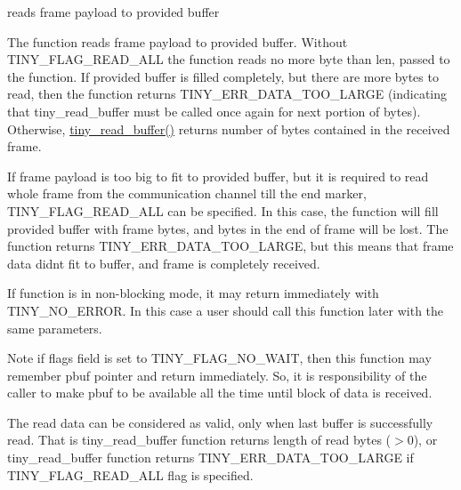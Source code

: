 reads frame payload to provided buffer 

The function reads frame payload to provided buffer. Without T\+I\+N\+Y\+\_\+\+F\+L\+A\+G\+\_\+\+R\+E\+A\+D\+\_\+\+A\+LL the function reads no more byte than len, passed to the function. If provided buffer is filled completely, but there are more bytes to read, then the function returns T\+I\+N\+Y\+\_\+\+E\+R\+R\+\_\+\+D\+A\+T\+A\+\_\+\+T\+O\+O\+\_\+\+L\+A\+R\+GE (indicating that tiny\+\_\+read\+\_\+buffer must be called once again for next portion of bytes). Otherwise, \hyperlink{group__ADVANCED__API_gade4e07eb12b8e32e6dd0c7b9757e8f39}{tiny\+\_\+read\+\_\+buffer()} returns number of bytes contained in the received frame.

If frame payload is too big to fit to provided buffer, but it is required to read whole frame from the communication channel till the end marker, T\+I\+N\+Y\+\_\+\+F\+L\+A\+G\+\_\+\+R\+E\+A\+D\+\_\+\+A\+LL can be specified. In this case, the function will fill provided buffer with frame bytes, and bytes in the end of frame will be lost. The function returns T\+I\+N\+Y\+\_\+\+E\+R\+R\+\_\+\+D\+A\+T\+A\+\_\+\+T\+O\+O\+\_\+\+L\+A\+R\+GE, but this means that frame data didn\textquotesingle{}t fit to buffer, and frame is completely received.

If function is in non-\/blocking mode, it may return immediately with T\+I\+N\+Y\+\_\+\+N\+O\+\_\+\+E\+R\+R\+OR. In this case a user should call this function later with the same parameters.

\begin{DoxyNote}{Note}
if flags field is set to T\+I\+N\+Y\+\_\+\+F\+L\+A\+G\+\_\+\+N\+O\+\_\+\+W\+A\+IT, then this function may remember pbuf pointer and return immediately. So, it is responsibility of the caller to make pbuf to be available all the time until block of data is received.

The read data can be considered as valid, only when last buffer is successfully read. That is tiny\+\_\+read\+\_\+buffer function returns length of read bytes ($>$0), or tiny\+\_\+read\+\_\+buffer function returns T\+I\+N\+Y\+\_\+\+E\+R\+R\+\_\+\+D\+A\+T\+A\+\_\+\+T\+O\+O\+\_\+\+L\+A\+R\+GE if T\+I\+N\+Y\+\_\+\+F\+L\+A\+G\+\_\+\+R\+E\+A\+D\+\_\+\+A\+LL flag is specified.
\end{DoxyNote}

